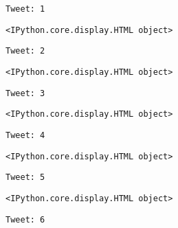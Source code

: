     \begin{Verbatim}[commandchars=\\\{\}]
Tweet: 1
    \end{Verbatim}

    
    \begin{Verbatim}[commandchars=\\\{\}]
<IPython.core.display.HTML object>
    \end{Verbatim}

    
    \begin{Verbatim}[commandchars=\\\{\}]
Tweet: 2
    \end{Verbatim}

    
    \begin{Verbatim}[commandchars=\\\{\}]
<IPython.core.display.HTML object>
    \end{Verbatim}

    
    \begin{Verbatim}[commandchars=\\\{\}]
Tweet: 3
    \end{Verbatim}

    
    \begin{Verbatim}[commandchars=\\\{\}]
<IPython.core.display.HTML object>
    \end{Verbatim}

    
    \begin{Verbatim}[commandchars=\\\{\}]
Tweet: 4
    \end{Verbatim}

    
    \begin{Verbatim}[commandchars=\\\{\}]
<IPython.core.display.HTML object>
    \end{Verbatim}

    
    \begin{Verbatim}[commandchars=\\\{\}]
Tweet: 5
    \end{Verbatim}

    
    \begin{Verbatim}[commandchars=\\\{\}]
<IPython.core.display.HTML object>
    \end{Verbatim}

    
    \begin{Verbatim}[commandchars=\\\{\}]
Tweet: 6
    \end{Verbatim}

